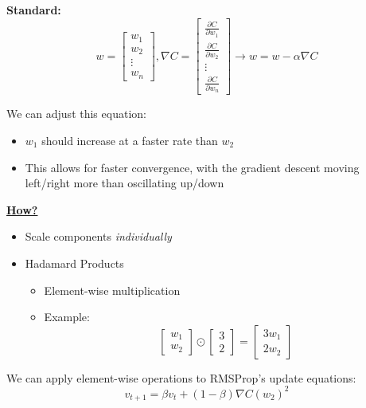 \textbf{Standard:} \[ w =
\begin{bmatrix}
w_1 \\
w_2 \\
\vdots \\
w_n
\end{bmatrix}, \nabla C = \begin{bmatrix}
    \frac{\partial C}{\partial w_1} \\
\frac{\partial C}{\partial w_2} \\
\vdots \\
\frac{\partial C}{\partial w_n}
\end{bmatrix}
\rightarrow
w=w -\alpha\nabla C
\]

We can adjust this equation:
\begin{itemize}
    \item $w_1$ should increase at a faster rate than $w_2$
    \item This allows for faster convergence, with the gradient descent moving left/right more than oscillating up/down
\end{itemize}
\underline{\textbf{How?}}
\begin{itemize}
    \item Scale components \textit{individually}
    \item Hadamard Products
    \begin{itemize}
        \item Element-wise multiplication
        \item Example: \\
        \[
        \begin{bmatrix}
            w_1 \\
            w_2
        \end{bmatrix} \odot 
        \begin{bmatrix}
            3 \\
            2
        \end{bmatrix} =
        \begin{bmatrix}
            3w_1 \\
            2w_2
        \end{bmatrix}
        \]
    \end{itemize}
    
\end{itemize}
We can apply element-wise operations to RMSProp's update equations:
\[
v_{t+1} = \beta v_t + (1-\beta) \nabla C(w_2)^2
\]

